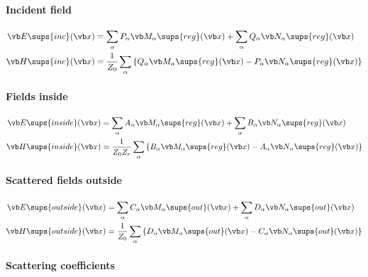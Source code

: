 \documentclass[letterpaper]{article}
\begin{document}
\paragraph{Incident field}
\begin{align*}
 \vb E\sups{inc}(\vb x) 
 &=   \sum_\alpha P_\alpha \vb M_\alpha\sups{reg}(\vb x)
    + \sum_\alpha Q_\alpha \vb N_\alpha\sups{reg}(\vb x)
\\
 \vb H\sups{inc}(\vb x) 
 &= \frac{1}{Z_0}
    \sum_\alpha \left\{  Q_\alpha \vb M_\alpha\sups{reg}(\vb x)
                       - P_\alpha \vb N_\alpha\sups{reg}(\vb x)
                \right\}
\end{align*}

\paragraph{Fields inside}
\begin{align*}
 \vb E\sups{inside}(\vb x) 
 &=   \sum_\alpha A_\alpha \vb M_\alpha\sups{reg}(\vb x)
    + \sum_\alpha B_\alpha \vb N_\alpha\sups{reg}(\vb x)
\\
 \vb H\sups{inside}(\vb x) 
 &= \frac{1}{Z_0 Z_r}
    \sum_\alpha \left\{  B_\alpha \vb M_\alpha\sups{reg}(\vb x)
                       - A_\alpha \vb N_\alpha\sups{reg}(\vb x)
                \right\}
\end{align*}

\paragraph{Scattered fields outside }
\begin{align*}
 \vb E\sups{outside}(\vb x) 
 &=   \sum_\alpha C_\alpha \vb M_\alpha\sups{out}(\vb x)
    + \sum_\alpha D_\alpha \vb N_\alpha\sups{out}(\vb x)
\\
 \vb H\sups{outside}(\vb x) 
 &= \frac{1}{Z_0}
    \sum_\alpha \left\{  D_\alpha \vb M_\alpha\sups{out}(\vb x)
                       - C_\alpha \vb N_\alpha\sups{out}(\vb x)
                \right\}
\end{align*}

\paragraph{Scattering coefficients}
\end{document}
